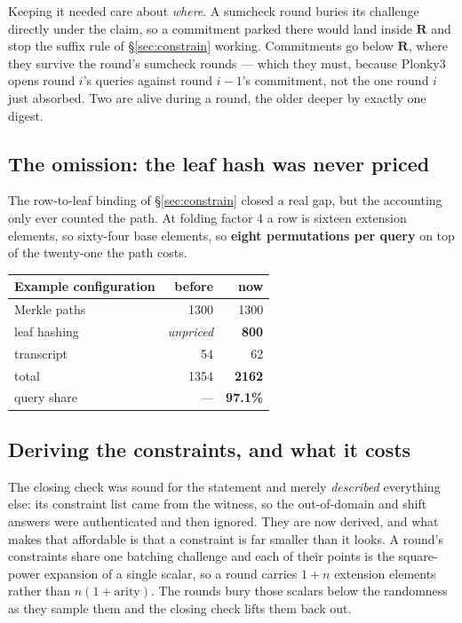 \documentclass[11pt,a4paper]{article}
\begin{document}
Keeping it needed care about \emph{where}. A sumcheck round buries its challenge directly under the
claim, so a commitment parked there would land inside $\boldsymbol R$ and stop the suffix rule of
\S\ref{sec:constrain} working. Commitments go below $\boldsymbol R$, where they survive the round's sumcheck rounds
--- which they must, because Plonky3 opens round $i$'s queries against round $i-1$'s commitment, not
the one round $i$ just absorbed. Two are alive during a round, the older deeper by exactly one digest.

\subsection*{The omission: the leaf hash was never priced}

The row-to-leaf binding of \S\ref{sec:constrain} closed a real gap, but the accounting only ever counted the path. At
folding factor 4 a row is sixteen extension elements, so sixty-four base elements, so \textbf{eight
permutations per query} on top of the twenty-one the path costs.

\begin{center}\small
\begin{tabular}{@{}lrr@{}}
\toprule
\textbf{Example configuration} & \textbf{before} & \textbf{now}\\
\midrule
Merkle paths & 1300 & 1300\\
leaf hashing & \emph{unpriced} & \textbf{800}\\
transcript & 54 & 62\\
\midrule
total & 1354 & \textbf{2162}\\
query share & --- & \textbf{97.1\%}\\
\bottomrule
\end{tabular}
\end{center}

\subsection*{Deriving the constraints, and what it costs}

The closing check was sound for the statement and merely \emph{described} everything else: its
constraint list came from the witness, so the out-of-domain and shift answers were authenticated and
then ignored. They are now derived, and what makes that affordable is that a constraint is far
smaller than it looks. A round's constraints share one batching challenge and each of their points is
the square-power expansion of a single scalar, so a round carries $1+n$ extension elements rather
than $n(1+\text{arity})$. The rounds bury those scalars below the randomness as they sample them and
the closing check lifts them back out.
\end{document}
